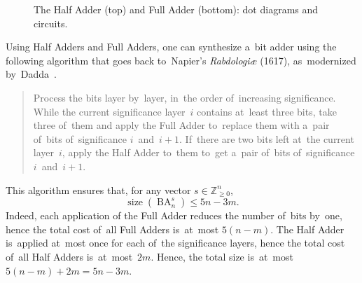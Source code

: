 \documentclass[a4paper, UKenglish, cleveref, autoref,  thm-restate]{lipics-v2021}
\DeclareMathOperator{\BA}{BA}
\begin{document}
\begin{figure}
\begin{center}
        \end{center}
        \caption{The Half Adder (top) and Full Adder (bottom): dot diagrams and circuits.}
        \label{figure:sum23}
    \end{figure}

    Using Half Adders and Full Adders, one can synthesize a~bit adder using the following algorithm that goes back to~Napier's \emph{Rabdologiæ} (1617),
    as~modernized by~Dadda~\cite{dadda}.
    \begin{quote}
        Process the bits layer by~layer, in~the order of~increasing significance.
        While the current significance layer~$i$ contains at~least three bits,
        take three of~them and apply the Full Adder to~replace them with a~pair of~bits
        of~significance $i$~and~$i+1$. If~there are two bits left at~the current layer~$i$, apply the Half Adder to~them to~get a~pair of~bits of~significance $i$~and~$i+1$.
    \end{quote}
    This algorithm ensures that, for any vector $s \in \mathbb{Z}_{\ge 0}^n$,
    \[\operatorname{size}(\BA_n^s) \le 5n-3m.\]
    Indeed, each application of the Full Adder reduces the number of~bits by~one,
    hence the total cost of~all Full Adders is~at~most $5(n-m)$. The Half Adder is~applied at~most once for each of~the significance layers, hence
    the total cost of~all Half Adders is~at~most~$2m$. Hence, the total size
    is~at~most $5(n-m)+2m=5n-3m$.
\end{document}
